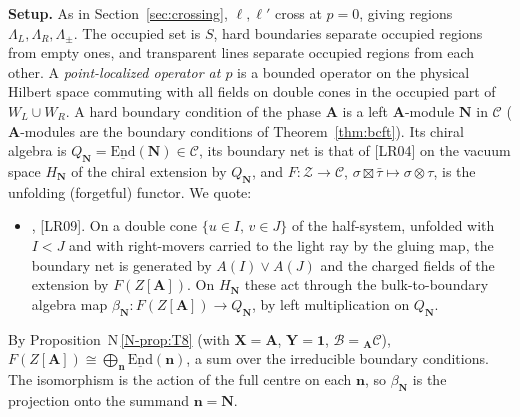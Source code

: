 \documentclass[11pt]{article}
\theoremstyle{definition}
\theoremstyle{remark}
\newcommand{\bfA}{\mathbf A}
\newcommand{\nref}[1]{N\,\ref{N-#1}}
\begin{document}
\textbf{Setup.} As in Section~\ref{sec:crossing}, $\ell,\ell'$ cross at $p=0$, giving regions $\Lambda_L,\Lambda_R,\Lambda_\pm$. The occupied set is $S$, hard boundaries separate occupied regions from empty ones, and transparent lines separate occupied regions from each other. A \emph{point-localized operator at $p$} is a bounded operator on the physical Hilbert space commuting with all fields on double cones in the occupied part of $W_L\cup W_R$. A hard boundary condition of the phase $\bfA$ is a left $\bfA$-module $\mathbf N$ in $\mathcal C$ ($\bfA$-modules are the boundary conditions of Theorem~\ref{thm:bcft}). Its chiral algebra is $Q_{\mathbf N}=\underline{\mathrm{End}}(\mathbf N)\in\mathcal C$, its boundary net is that of [LR04] on the vacuum space $H_{\mathbf N}$ of the chiral extension by $Q_{\mathbf N}$, and $F\colon\mathcal Z\to\mathcal C$, $\sigma\boxtimes\bar\tau\mapsto\sigma\otimes\tau$, is the unfolding (forgetful) functor. We quote:
\begin{itemize}[leftmargin=2.6em]
\item[(B)] [LR04], [LR09]. On a double cone $\{u\in I,\,v\in J\}$ of the half-system, unfolded with $I<J$ and with right-movers carried to the light ray by the gluing map, the boundary net is generated by $A(I)\vee A(J)$ and the charged fields of the extension by $F(Z[\bfA])$. On $H_{\mathbf N}$ these act through the bulk-to-boundary algebra map $\beta_{\mathbf N}\colon F(Z[\bfA])\to Q_{\mathbf N}$, by left multiplication on $Q_{\mathbf N}$.
\end{itemize}
By Proposition~\nref{prop:T8} (with $\mathbf X=\bfA$, $\mathbf Y=\mathbf 1$, $\mathcal B={}_{\bfA}\mathcal C$), $F(Z[\bfA])\cong\bigoplus_{\mathbf n}\underline{\mathrm{End}}(\mathbf n)$, a sum over the irreducible boundary conditions. The isomorphism is the action of the full centre on each $\mathbf n$, so $\beta_{\mathbf N}$ is the projection onto the summand $\mathbf n=\mathbf N$.
\end{document}
